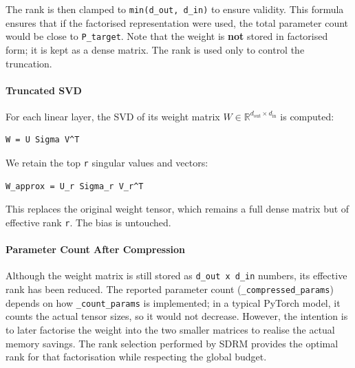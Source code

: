 The rank is then clamped to \texttt{min(d\_out, d\_in)} to ensure validity. This formula ensures that if the factorised representation were used, the total parameter count would be close to \texttt{P\_target}. Note that the weight is \textbf{not} stored in factorised form; it is kept as a dense matrix. The rank is used only to control the truncation.

\paragraph{Truncated SVD}

For each linear layer, the SVD of its weight matrix $W \in \mathbb{R}^{d_{\text{out}} \times d_{\text{in}}}$ is computed:

\vspace{0.5em}
\begin{mdframed}[backgroundcolor=codebg, linecolor=codeframe, linewidth=1pt, roundcorner=4pt, innerleftmargin=2pt, innerrightmargin=5pt, innertopmargin=5pt, innerbottommargin=5pt]
\begin{lstlisting}
W = U Sigma V^T
\end{lstlisting}
\end{mdframed}
\vspace{0.5em}

We retain the top \texttt{r} singular values and vectors:

\vspace{0.5em}
\begin{mdframed}[backgroundcolor=codebg, linecolor=codeframe, linewidth=1pt, roundcorner=4pt, innerleftmargin=2pt, innerrightmargin=5pt, innertopmargin=5pt, innerbottommargin=5pt]
\begin{lstlisting}
W_approx = U_r Sigma_r V_r^T
\end{lstlisting}
\end{mdframed}
\vspace{0.5em}

This replaces the original weight tensor, which remains a full dense matrix but of effective rank \texttt{r}. The bias is untouched.

\paragraph{Parameter Count After Compression}

Although the weight matrix is still stored as \texttt{d\_out x d\_in} numbers, its effective rank has been reduced. The reported parameter count (\texttt{\_compressed\_params}) depends on how \texttt{\_count\_params} is implemented; in a typical PyTorch model, it counts the actual tensor sizes, so it would not decrease. However, the intention is to later factorise the weight into the two smaller matrices to realise the actual memory savings. The rank selection performed by SDRM provides the optimal rank for that factorisation while respecting the global budget.


